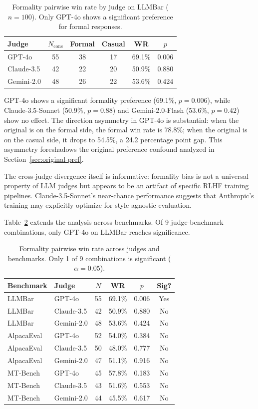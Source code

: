 \documentclass[11pt,a4paper]{article}
\begin{document}
\begin{table}[t]
\centering
\caption{Formality pairwise win rate by judge on LLMBar ($n=100$). Only GPT-4o shows a significant preference for formal responses.}
\label{tab:formality-judges}
\small
\begin{tabular}{lccccc}
\toprule
\textbf{Judge} & \textbf{$N_\text{cons}$} & \textbf{Formal} & \textbf{Casual} & \textbf{WR} & \textbf{$p$} \\
\midrule
GPT-4o & 55 & 38 & 17 & 69.1\% & 0.006 \\
Claude-3.5 & 42 & 22 & 20 & 50.9\% & 0.880 \\
Gemini-2.0 & 48 & 26 & 22 & 53.6\% & 0.424 \\
\bottomrule
\end{tabular}
\end{table}

GPT-4o shows a significant formality preference (69.1\%, $p=0.006$), while Claude-3.5-Sonnet (50.9\%, $p=0.88$) and Gemini-2.0-Flash (53.6\%, $p=0.42$) show no effect.
The direction asymmetry in GPT-4o is substantial: when the original is on the formal side, the formal win rate is 78.8\%; when the original is on the casual side, it drops to 54.5\%, a 24.2 percentage point gap.
This asymmetry foreshadows the original preference confound analyzed in Section~\ref{sec:original-pref}.

The cross-judge divergence itself is informative: formality bias is not a universal property of LLM judges but appears to be an artifact of specific RLHF training pipelines.
Claude-3.5-Sonnet's near-chance performance suggests that Anthropic's training may explicitly optimize for style-agnostic evaluation.

Table~\ref{tab:cross-benchmark} extends the analysis across benchmarks.
Of 9 judge-benchmark combinations, only GPT-4o on LLMBar reaches significance.

\begin{table}[t]
\centering
\caption{Formality pairwise win rate across judges and benchmarks. Only 1 of 9 combinations is significant ($\alpha=0.05$).}
\label{tab:cross-benchmark}
\small
\begin{tabular}{llcccc}
\toprule
\textbf{Benchmark} & \textbf{Judge} & \textbf{$N$} & \textbf{WR} & \textbf{$p$} & \textbf{Sig?} \\
\midrule
LLMBar & GPT-4o & 55 & 69.1\% & 0.006 & Yes \\
LLMBar & Claude-3.5 & 42 & 50.9\% & 0.880 & No \\
LLMBar & Gemini-2.0 & 48 & 53.6\% & 0.424 & No \\
\midrule
AlpacaEval & GPT-4o & 52 & 54.0\% & 0.384 & No \\
AlpacaEval & Claude-3.5 & 50 & 48.0\% & 0.777 & No \\
AlpacaEval & Gemini-2.0 & 47 & 51.1\% & 0.916 & No \\
\midrule
MT-Bench & GPT-4o & 45 & 57.8\% & 0.183 & No \\
MT-Bench & Claude-3.5 & 43 & 51.6\% & 0.553 & No \\
MT-Bench & Gemini-2.0 & 44 & 45.5\% & 0.617 & No \\
\bottomrule
\end{tabular}
\end{table}
\end{document}

